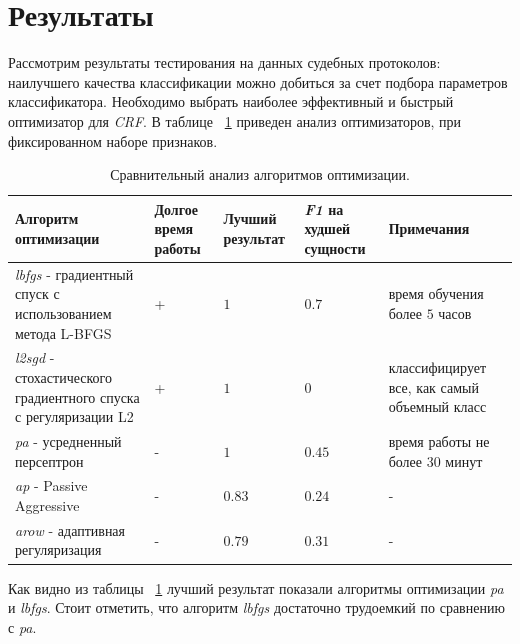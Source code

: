 \documentclass{csmathnotes}
\begin{document}
\section*{Результаты}
Рассмотрим результаты тестирования на данных судебных протоколов: наилучшего качества классификации можно добиться за счет подбора параметров классификатора. Необходимо выбрать наиболее эффективный и быстрый оптимизатор для \emph{CRF}. В таблице ~\ref{tabl:table1} приведен анализ оптимизаторов, при фиксированном наборе признаков.
\begin{table}[!h]
	\begin{center}
		\begin{tabular}{|p{3cm}|p{1.3cm}|p{1.5cm}|p{1.5cm}|p{2.5cm}|}
			\hline
			Алгоритм оптимизации &  Долгое время работы & Лучший результат & \emph{F1} на худшей сущности & Примечания \\
			\hline
			\emph{lbfgs} - градиентный спуск с использованием метода 
			L-BFGS & + & $1$ & $0.7$ & время обучения более $5$ часов  \\
			\hline
			\emph{l2sgd} - стохастического  градиентного спуска  с регуляризации L2 & + & $1$  & $0$ & классифицирует все, как самый объемный класс \\
			\hline
			\emph{pa} - усредненный персептрон & - & $1$  & $0.45$ & время работы не более $30$ минут \\
			\hline
			\emph{ap} - Passive Aggressive & - & $0.83$ & $0.24$  & - \\
			\hline
			\emph{arow} - адаптивная регуляризация  & - & $0.79$ & $0.31$  & - \\
			\hline
		\end{tabular}
	\end{center}
	\caption{\label{tabl:table1}Сравнительный анализ алгоритмов оптимизации.}
\end{table}

Как видно из таблицы ~\ref{tabl:table1} лучший результат показали алгоритмы оптимизации \emph{pa} и \emph{lbfgs}. Стоит отметить, что алгоритм \emph{lbfgs}  достаточно трудоемкий по сравнению с \emph{pa}.
\end{document}
